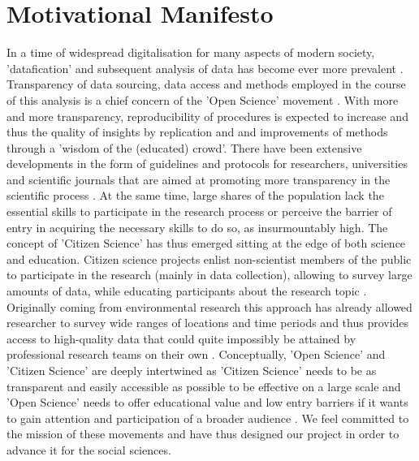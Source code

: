 \documentclass[preprint,12pt,authoryear]{elsarticle}
\begin{document}
	\section{Motivational Manifesto}
	In a time of widespread digitalisation for many aspects of modern society, 'datafication' and subsequent analysis of data has become ever more prevalent \citep{baack_datafication_2015, lycett_datafication:_2013}. Transparency of data sourcing, data access and methods employed in the course of this analysis is a chief concern of the 'Open Science' movement \citep{delfanti_open_2010}. With more and more transparency, reproducibility of procedures is expected to increase and thus the quality of insights by replication and and improvements of methods through a 'wisdom of the (educated) crowd'. There have been extensive developments in the form of guidelines and protocols for researchers, universities and scientific journals that are aimed at promoting more transparency in the scientific process \citep{nosek_promoting_2015, miguel_promoting_2014}. 
	At the same time, large shares of the population lack the essential skills to participate in the research process or perceive the barrier of entry in acquiring the necessary skills to do so, as insurmountably high. The concept of 'Citizen Science' has thus emerged sitting at the edge of both science and education. Citizen science projects enlist non-scientist members of the public to participate in the research (mainly in data collection), allowing to survey large amounts of data, while educating participants about the research topic \citep{shirk_public_2012}. Originally coming from environmental research this approach has already allowed researcher to survey wide ranges of locations and time periods and thus provides access to high-quality data that could quite impossibly be attained by professional research teams on their own \citep{bonney_citizen_2009}.
	Conceptually, 'Open Science' and 'Citizen Science' are deeply intertwined as 'Citizen Science' needs to be as transparent and easily accessible as possible to be effective on a large scale \citep{nov_dusting_2011} and 'Open Science' needs to offer educational value and low entry barriers if it wants to gain attention and participation of a broader audience \citep{newman_future_2012}. We feel committed to the mission of these movements and have thus designed our project in order to advance it for the social sciences. 
\end{document}
